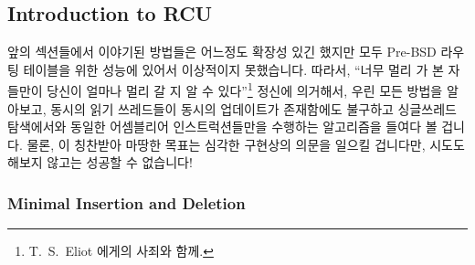 
\subsection{Introduction to RCU}
\label{sec:defer:Introduction to RCU}

앞의 섹션들에서 이야기된 방법들은 어느정도 확장성 있긴 했지만 모두 Pre-BSD
라우팅 테이블을 위한 성능에 있어서 이상적이지 못했습니다.
따라서, ``너무 멀리 가 본 자들만이 당신이 얼마나 멀리 갈 지 알 수
있다''\footnote{T.~S.~Eliot 에게의 사죄와 함께.} 정신에 의거해서, 우린 모든
방법을 알아보고, 동시의 읽기 쓰레드들이 동시의 업데이트가 존재함에도 불구하고
싱글쓰레드 탐색에서와 동일한 어셈블리어 인스트럭션들만을 수행하는 알고리즘을
들여다 볼 겁니다.
물론, 이 칭찬받아 마땅한 목표는 심각한 구현상의 의문을 일으킬 겁니다만, 시도도
해보지 않고는 성공할 수 없습니다!

\subsubsection{Minimal Insertion and Deletion}
\label{sec:defer:Minimal Insertion and Deletion}

